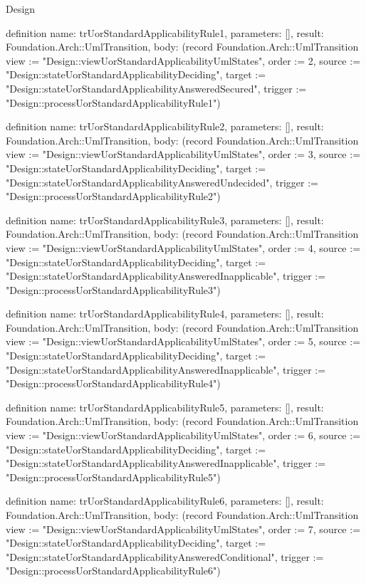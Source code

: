 \begin{lexlean}{Design}
\begin{semanticmodule}
definition{
  name: trUorStandardApplicabilityRule1,
  parameters: [],
  result: Foundation.Arch::UmlTransition,
  body: (record Foundation.Arch::UmlTransition {view := "Design::viewUorStandardApplicabilityUmlStates", order := 2, source := "Design::stateUorStandardApplicabilityDeciding", target := "Design::stateUorStandardApplicabilityAnsweredSecured", trigger := "Design::processUorStandardApplicabilityRule1"})
}

definition{
  name: trUorStandardApplicabilityRule2,
  parameters: [],
  result: Foundation.Arch::UmlTransition,
  body: (record Foundation.Arch::UmlTransition {view := "Design::viewUorStandardApplicabilityUmlStates", order := 3, source := "Design::stateUorStandardApplicabilityDeciding", target := "Design::stateUorStandardApplicabilityAnsweredUndecided", trigger := "Design::processUorStandardApplicabilityRule2"})
}

definition{
  name: trUorStandardApplicabilityRule3,
  parameters: [],
  result: Foundation.Arch::UmlTransition,
  body: (record Foundation.Arch::UmlTransition {view := "Design::viewUorStandardApplicabilityUmlStates", order := 4, source := "Design::stateUorStandardApplicabilityDeciding", target := "Design::stateUorStandardApplicabilityAnsweredInapplicable", trigger := "Design::processUorStandardApplicabilityRule3"})
}

definition{
  name: trUorStandardApplicabilityRule4,
  parameters: [],
  result: Foundation.Arch::UmlTransition,
  body: (record Foundation.Arch::UmlTransition {view := "Design::viewUorStandardApplicabilityUmlStates", order := 5, source := "Design::stateUorStandardApplicabilityDeciding", target := "Design::stateUorStandardApplicabilityAnsweredInapplicable", trigger := "Design::processUorStandardApplicabilityRule4"})
}

definition{
  name: trUorStandardApplicabilityRule5,
  parameters: [],
  result: Foundation.Arch::UmlTransition,
  body: (record Foundation.Arch::UmlTransition {view := "Design::viewUorStandardApplicabilityUmlStates", order := 6, source := "Design::stateUorStandardApplicabilityDeciding", target := "Design::stateUorStandardApplicabilityAnsweredInapplicable", trigger := "Design::processUorStandardApplicabilityRule5"})
}

definition{
  name: trUorStandardApplicabilityRule6,
  parameters: [],
  result: Foundation.Arch::UmlTransition,
  body: (record Foundation.Arch::UmlTransition {view := "Design::viewUorStandardApplicabilityUmlStates", order := 7, source := "Design::stateUorStandardApplicabilityDeciding", target := "Design::stateUorStandardApplicabilityAnsweredConditional", trigger := "Design::processUorStandardApplicabilityRule6"})
}


\end{semanticmodule}
\end{lexlean}

